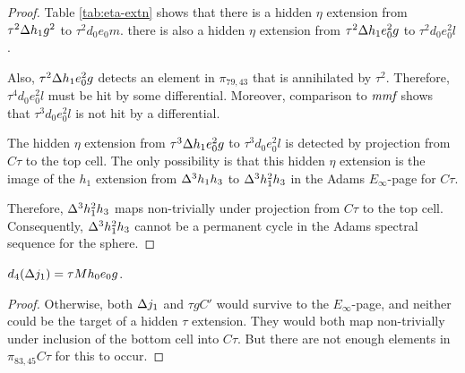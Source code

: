 \begin{proof}
Table \ref{tab:eta-extn} shows that there is a hidden
$\eta$ extension from $\tau^2 \Delta h_1 g^2$ to $\tau^2 d_0 e_0 m$.
there is also a hidden $\eta$ extension
from $\tau^2 \Delta h_1 e_0^2 g$ to $\tau^2 d_0 e_0^2 l$.

Also, $\tau^2 \Delta h_1 e_0^2 g$ 
detects an element in $\pi_{79,43}$ that is annihilated by $\tau^2$.
Therefore, $\tau^4 d_0 e_0^2 l$ must be hit by some
differential.
Moreover, comparison to $\textit{mmf}$ shows that 
$\tau^3 d_0 e_0^2 l$ is not hit by a differential.

The hidden $\eta$ extension from $\tau^3 \Delta h_1 e_0^2 g$
to $\tau^3 d_0 e_0^2 l$ is detected by projection from
$C\tau$ to the top cell.
The only possibility is that this hidden $\eta$ extension is
the image of the $h_1$ extension
from $\Delta^3 h_1 h_3$ to $\Delta^3 h_1^2 h_3$
in the Adams $E_\infty$-page for $C\tau$.

Therefore, $\Delta^3 h_1^2 h_3$ maps non-trivially under projection
from $C\tau$ to the top cell.
Consequently,
$\Delta^3 h_1^2 h_3$ cannot be a permanent cycle in the
Adams spectral sequence for the sphere.
\end{proof}

\begin{lemma}
\label{lem:d4-Dj1}
$d_4(\Delta j_1) = \tau M h_0 e_0 g$.
\end{lemma}

\begin{proof}
Otherwise, both $\Delta j_1$ and $\tau g C'$ would survive to the
$E_\infty$-page, and neither could be the target of a
hidden $\tau$ extension.  They would both map non-trivially
under inclusion of the bottom cell into $C\tau$.
But there are not enough elements in $\pi_{83,45} C\tau$
for this to occur.
\end{proof}


